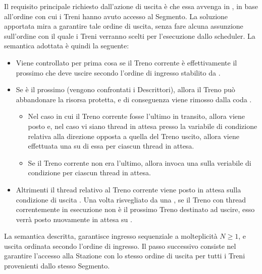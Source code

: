 \begin{description}
			Il requisito principale richiesto dall'azione di uscita è che essa avvenga in , in base all'ordine con cui i Treni hanno avuto accesso al Segmento. La soluzione apportata mira a garantire tale ordine di uscita, senza fare alcuna assunzione sull'ordine con il quale i Treni verranno scelti per l'esecuzione dallo scheduler. La semantica adottata è quindi la seguente:
			\begin{itemize}
				 \item Viene controllato per prima cosa se il Treno corrente è effettivamente il prossimo che deve uscire secondo l'ordine di ingresso stabilito da .
				 \item Se è il prossimo (vengono confrontati i Descrittori), allora il Treno può abbandonare la risorsa protetta, e di conseguenza viene rimosso dalla coda . 
				 \begin{itemize}
				 	\item Nel caso in cui il Treno corrente fosse l'ultimo in transito, allora viene posto  e, nel caso vi siano thread in attesa presso la variabile di condizione relativa alla direzione opposta a quella del Treno uscito, allora viene effettuata una  su di essa per ciascun thread in attesa. 
				 	\item Se il Treno corrente non era l'ultimo, allora invoca una  sulla veriabile di condizione  per ciascun thread in attesa.
				 \end{itemize}
				 \item Altrimenti il thread relativo al Treno corrente viene posto in attesa sulla condizione di uscita . Una volta risvegliato da una , se il Treno con thread correntemente in esecuzione non è il prossimo Treno destinato ad uscire, esso verrà posto nuovamente in attesa su . 
			\end{itemize}
		\end {description}
	
	La semantica descritta, garantisce ingresso sequenziale a molteplicità $N\ge1$, e uscita ordinata secondo l'ordine di ingresso. Il passo successivo consiste nel garantire l'accesso alla Stazione con lo stesso ordine di uscita per tutti i Treni provenienti dallo stesso Segmento.


